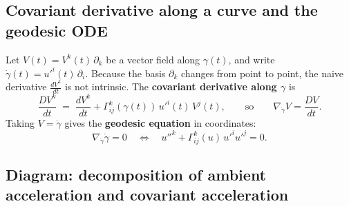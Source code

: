 \documentclass[12pt,a4paper]{article}
\theoremstyle{plain}
\theoremstyle{definition}      %
\begin{document}
\subsection*{Covariant derivative along a curve and the geodesic ODE}

Let $V(t)=V^k(t)\,\partial_k$ be a vector field along $\gamma(t)$, and write $\dot\gamma(t)=u'^i(t)\,\partial_i$.
Because the basis $\partial_k$ changes from point to point, the naive derivative $\frac{dV^k}{dt}$ is not intrinsic.
The \textbf{covariant derivative along $\gamma$} is
\[
\frac{D V^k}{dt}
\;=\;
\frac{dV^k}{dt}
+
\Gamma^k_{ij}(\gamma(t))\,u'^i(t)\,V^j(t),
\qquad\text{so}\qquad
\nabla_{\dot\gamma}V=\frac{DV}{dt}.
\]
Taking $V=\dot\gamma$ gives the \textbf{geodesic equation} in coordinates:
\[
\nabla_{\dot\gamma}\dot\gamma=0
\quad\Longleftrightarrow\quad
u''^{k}+\Gamma^{k}_{ij}(u)\,u'^i u'^j=0.
\]

\subsection*{Diagram: decomposition of ambient acceleration and covariant acceleration}
\end{document}

